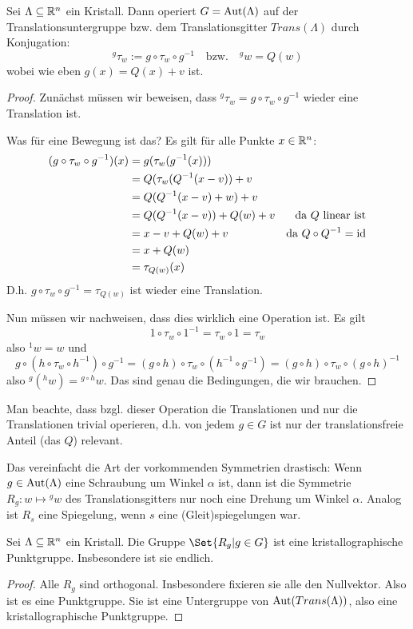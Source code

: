 \begin{lemma}
Sei $\Lambda\subseteq\mathbb{R}^n$ ein Kristall. Dann operiert $G=\operatorname{Aut}(\Lambda)$ auf der Translationsuntergruppe bzw. dem Translationsgitter $Trans(\Lambda)$ durch Konjugation:
\[{^g \tau_w} := g\circ\tau_w\circ g^{-1} \quad\text{bzw.}\quad {^g w} = Q(w)\]
wobei wie eben $g(x)=Q(x)+v$ ist.
\end{lemma}
\begin{proof}
Zunächst müssen wir beweisen, dass ${^g \tau_w}=g\circ\tau_w\circ g^{-1}$ wieder eine Translation ist.

Was für eine Bewegung ist das? Es gilt für alle Punkte $x\in\mathbb{R}^n$:
\begin{align*}
(g\circ\tau_w\circ g^{-1})(x) &= g(\tau_w(g^{-1}(x))) \\
&= Q(\tau_w(Q^{-1}(x-v))+v \\
&= Q(Q^{-1}(x-v)+w)+v \\
&= Q(Q^{-1}(x-v))+Q(w)+v &\text{da $Q$ linear ist}\\
&= x-v+Q(w)+v &\text{da }Q\circ Q^{-1}=\operatorname{id}\\
&= x+Q(w) \\
&=\tau_{Q(w)}(x)
\end{align*}
D.h. $g\circ\tau_w\circ g^{-1} = \tau_{Q(w)}$ ist wieder eine Translation.

\medbreak
Nun müssen wir nachweisen, dass dies wirklich eine Operation ist. Es gilt
\[1\circ\tau_w\circ 1^{-1} = \tau_w\circ 1 = \tau_w\]
also ${^1 w} = w$ und
\[g\circ(h\circ\tau_w\circ h^{-1})\circ g^{-1} = (g\circ h)\circ\tau_w\circ(h^{-1}\circ g^{-1}) = (g\circ h)\circ\tau_w\circ(g\circ h)^{-1}\]
also ${^g(^h w)} = {^{g\circ h}w}$. Das sind genau die Bedingungen, die wir brauchen.
\end{proof}

\begin{remark}
Man beachte, dass bzgl. dieser Operation die Translationen und nur die Translationen trivial operieren, d.h. von jedem $g\in G$ ist nur der translationsfreie Anteil (das $Q$) relevant.

Das vereinfacht die Art der vorkommenden Symmetrien drastisch: Wenn $g\in\operatorname{Aut}(\Lambda)$ eine Schraubung um Winkel $\alpha$ ist, dann ist die Symmetrie $R_g:w\mapsto{^g w}$ des Translationsgitters nur noch eine Drehung um Winkel $\alpha$. Analog ist $R_s$ eine Spiegelung, wenn $s$ eine (Gleit)spiegelungen war.
\end{remark}

\begin{corollary}
Sei $\Lambda\subseteq\mathbb{R}^n$ ein Kristall. Die Gruppe $\Set{R_g | g\in G}$ ist eine kristallographische Punktgruppe. Insbesondere ist sie endlich.
\end{corollary}
\begin{proof}
Alle $R_g$ sind orthogonal. Insbesondere fixieren sie alle den Nullvektor. Also ist es eine Punktgruppe. Sie ist eine Untergruppe von $\operatorname{Aut}(Trans(\Lambda))$, also eine kristallographische Punktgruppe. 
\end{proof}

